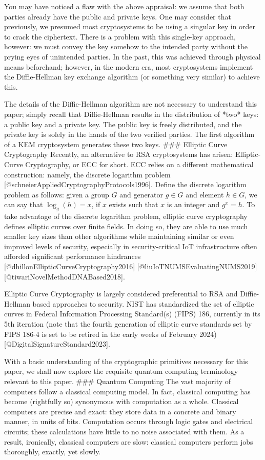 \documentclass[12pt]{article}
\begin{document}
You may have noticed a flaw with the above appraisal: we assume that both parties already have the public and private keys. One may consider that previously, we presumed most cryptosystems to be using a singular key in order to crack the ciphertext. There is a problem with this single-key approach, however: we must convey the key somehow to the intended party without the prying eyes of unintended parties. In the past, this was achieved through physical means beforehand; however, in the modern era, most cryptosystems implement the Diffie-Hellman key exchange algorithm (or something very similar) to achieve this. 

The details of the Diffie-Hellman algorithm are not necessary to understand this paper; simply recall that Diffie-Hellman results in the distribution of *two* keys: a public key and a private key. The public key is freely distributed, and the private key is solely in the hands of the two verified parties. The first algorithm of a KEM cryptosystem generates these two keys. 
### Elliptic Curve Cryptography
Recently, an alternative to RSA cryptosystems has arisen: Elliptic-Curve Cryptography, or ECC for short. ECC relies on a different mathematical construction: namely, the discrete logarithm problem [@schneierAppliedCryptographyProtocols1996]. Define the discrete logarithm problem as follows: given a group $G$ and generator $g \in G$ and element $h \in G$, we can say that $\log_g(h) = x$, if $x$ exists such that $x$ is an integer and $g^x = h$. To take advantage of the discrete logarithm problem, elliptic curve cryptography defines elliptic curves over finite fields. In doing so, they are able to use much smaller key sizes than other algorithms while maintaining similar or even improved levels of security, especially in security-critical IoT infrastructure often afforded significant performance hindrances [@dhillonEllipticCurveCryptography2016] [@liuIoTNUMSEvaluatingNUMS2019][@tiwariNovelMethodDNABased2018]. 

Elliptic Curve Cryptography is largely considered preferential to RSA and Diffie-Hellman based approaches to security. NIST has standardized the set of elliptic curves in Federal Information Processing Standard(s) (FIPS) 186, currently in its 5th iteration (note that the fourth generation of elliptic curve standards set by FIPS 186-4 is set to be retired in the early weeks of February 2024) [@DigitalSignatureStandard2023].  

With a basic understanding of the cryptographic primitives necessary for this paper, we shall now explore the requisite quantum computing terminology relevant to this paper. 
### Quantum Computing
The vast majority of computers follow a classical computing model. In fact, classical computing has become (rightfully so) synonymous with computation as a whole. Classical computers are precise and exact: they store data in a concrete and binary manner, in units of bits. Computation occurs through logic gates and electrical circuits; these calculations have little to no noise associated with them. As a result, ironically, classical computers are slow: classical computers perform jobs thoroughly, exactly, yet slowly. 
\end{document}

